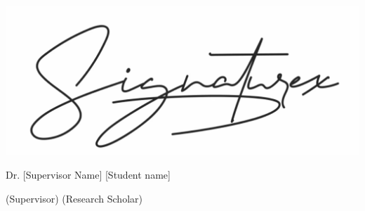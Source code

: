 \vspace{1cm}
\begin{flushleft}

\hfill
\includegraphics[height=3.5\baselineskip]{Chapters/signature.png}

\end{flushleft}

\begin{flushleft}
Dr. [Supervisor Name]
\hfill
[Student name]
\end{flushleft}


\begin{flushleft}
(Supervisor)
\hfill
(Research Scholar)
\end{flushleft}